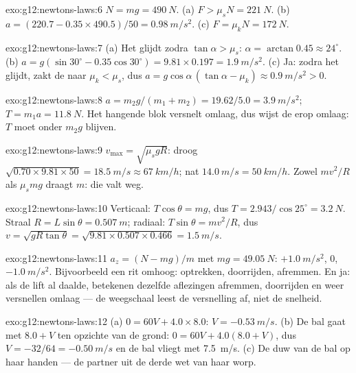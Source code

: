 \begin{solution}{exo:g12:newtons-laws:6}
$N = mg = \qty{490}{N}$. (a) $F > \mu_s N = \qty{221}{N}$.
(b) $a = (220.7 - 0.35 \times 490.5)/50 = \qty{0.98}{m/s^2}$.
(c) $F = \mu_k N = \qty{172}{N}$.
\end{solution}

\begin{solution}{exo:g12:newtons-laws:7}
(a) Het glijdt zodra $\tan\alpha > \mu_s$:
$\alpha = \arctan 0.45 \approx 24^\circ$.
(b) $a = g(\sin 30^\circ - 0.35\cos 30^\circ) = 9.81 \times 0.197 =
\qty{1.9}{m/s^2}$. (c) Ja: zodra het glijdt, zakt de  naar
$\mu_k < \mu_s$, dus
$a = g\cos\alpha\,(\tan\alpha - \mu_k) \approx \qty{0.9}{m/s^2} > 0$.
\end{solution}

\begin{solution}{exo:g12:newtons-laws:8}
$a = m_2 g/(m_1 + m_2) = 19.62/5.0 = \qty{3.9}{m/s^2}$;
$T = m_1 a = \qty{11.8}{N}$. Het hangende blok versnelt omlaag, dus wijst
de  erop omlaag: $T$ moet onder $m_2 g$ blijven.
\end{solution}

\begin{solution}{exo:g12:newtons-laws:9}
$v_{\max} = \sqrt{\mu_s g R}$: droog
$\sqrt{0.70 \times 9.81 \times 50} = \qty{18.5}{m/s} \approx
\qty{67}{km/h}$; nat $\qty{14.0}{m/s} = \qty{50}{km/h}$. Zowel
$mv^2/R$ als $\mu_s mg$ draagt $m$: die valt weg.
\end{solution}

\begin{solution}{exo:g12:newtons-laws:10}
Verticaal: $T\cos\theta = mg$, dus
$T = 2.943/\cos 25^\circ = \qty{3.2}{N}$. Straal
$R = L\sin\theta = \qty{0.507}{m}$; radiaal: $T\sin\theta = mv^2/R$, dus
$v = \sqrt{gR\tan\theta} = \sqrt{9.81 \times 0.507 \times 0.466}
= \qty{1.5}{m/s}$.
\end{solution}

\begin{solution}{exo:g12:newtons-laws:11}
$a_z = (N - mg)/m$ met $mg = \qty{49.05}{N}$: $+\qty{1.0}{m/s^2}$, $0$,
$-\qty{1.0}{m/s^2}$. Bijvoorbeeld een rit omhoog: optrekken, doorrijden,
afremmen. En ja: als de lift al daalde, betekenen dezelfde aflezingen
afremmen, doorrijden en weer versnellen omlaag --- de weegschaal leest de
versnelling af, niet de snelheid.
\end{solution}

\begin{solution}{exo:g12:newtons-laws:12}
(a) $0 = 60V + 4.0 \times 8.0$: $V = \qty{-0.53}{m/s}$. (b) De bal gaat
met $8.0 + V$ ten opzichte van de grond: $0 = 60V + 4.0(8.0 + V)$, dus
$V = -32/64 = \qty{-0.50}{m/s}$ en de bal vliegt met \qty{7.5}{m/s}.
(c) De duw van de bal op haar handen --- de partner uit de derde wet van
haar worp.
\end{solution}

